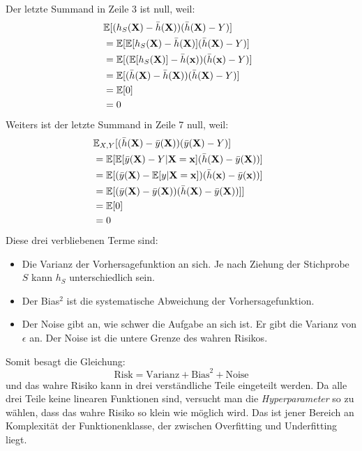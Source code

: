 Der letzte Summand in Zeile 3 ist null, weil:
\begin{equation*}
	\begin{split}
		\lefteqn{ \mathbb{E}[(h_S(\mathbf{X})-\bar{h}(\mathbf{X}))(\bar{h}(\mathbf{X})-Y)] } \\\
		& = \mathbb{E}[\mathbb{E}[h_S(\mathbf{X})-\bar{h}(\mathbf{X})](\bar{h}(\mathbf{X})-Y)] \\\
		& = \mathbb{E}[(\mathbb{E}[h_S(\mathbf{X})]-\bar{h}(\mathbf{x}))(\bar{h}(\mathbf{x})-Y)] \\\
		& = \mathbb{E}[(\bar{h}(\mathbf{X})-\bar{h}(\mathbf{X}))(\bar{h}(\mathbf{X})-Y)] \\\
		& = \mathbb{E}[0]\\\
		& = 0
	\end{split}
\end{equation*}
Weiters ist der letzte Summand in Zeile 7 null, weil:
\begin{equation*}
	\begin{split}
		\lefteqn{ \mathbb{E}_{X, Y}[(\bar{h}(\mathbf{X})-\bar{y}(\mathbf{X}))(\bar{y}(\mathbf{X})-Y)] } \\\
		& = \mathbb{E}[\mathbb{E}[\bar{y}(\mathbf{X})-Y|\mathbf{X} = \mathbf{x}](\bar{h}(\mathbf{X})-\bar{y}(\mathbf{X}))] \\\
		& = \mathbb{E}[(\bar{y}(\mathbf{X})-\mathbb{E}[y|\mathbf{X} = \mathbf{x}])(\bar{h}(\mathbf{x})-\bar{y}(\mathbf{x}))] \\\
		& = \mathbb{E}[(\bar{y}(\mathbf{X})-\bar{y}(\mathbf{X}))(\bar{h}(\mathbf{X})-\bar{y}(\mathbf{X}))]] \\\
		& = \mathbb{E}[0]\\\
		& = 0
	\end{split}
\end{equation*}
Diese drei verbliebenen Terme sind:
\begin{itemize}
	\item Die Varianz der Vorhersagefunktion an sich. Je nach Ziehung der Stichprobe $S$ kann $h_S$ unterschiedlich sein.
	\item Der Bias$^2$ ist die systematische Abweichung der Vorhersagefunktion. %
	\item Der Noise gibt an, wie schwer die Aufgabe an sich ist. Er gibt die Varianz von $\epsilon$ an. Der Noise ist die untere Grenze des wahren Risikos.
\end{itemize}

Somit besagt die Gleichung:
$$ \text{Risk} = \text{Varianz} + \text{Bias}^2 + \text{Noise} $$
und das wahre Risiko kann in drei verst\"andliche Teile eingeteilt werden. Da alle drei Teile keine linearen Funktionen sind,
versucht man die \textit{Hyperparameter} so zu w\"ahlen, dass das wahre Risiko so klein wie
m\"oglich wird. Das ist jener Bereich an Komplexit\"at der Funktionenklasse, der zwischen Overfitting und Underfitting liegt.


